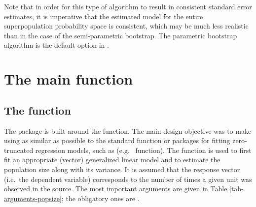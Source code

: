 \documentclass[
]{jss}
\newcommand{\1}{\mathcal{I}} \newcommand{\bZero}{\boldsymbol{0}}
\begin{document}
Note that in order for this type of algorithm to result in consistent
standard error estimates, it is imperative that the estimated model for
the entire superpopulation probability space is consistent, which may be
much less realistic than in the case of the semi-parametric bootstrap.
The parametric bootstrap algorithm is the default option in
.

\section{The main function}\label{sec-main}

\subsection[The estimatePopsize function]{The  function}

The  package is built around the
 function. The main design objective was to make
using  as similar as possible to the standard
 function or packages for fitting zero-truncated
regression models, such as 
(e.g.~ function). The 
function is used to first fit an appropriate (vector) generalized linear
model and to estimate the population size along with its variance. It is
assumed that the response vector (i.e.~the dependent variable)
corresponds to the number of times a given unit was observed in the
source. The most important arguments are given in Table
\ref{tab-arguments-popsize}; the obligatory ones are
.
\end{document}
